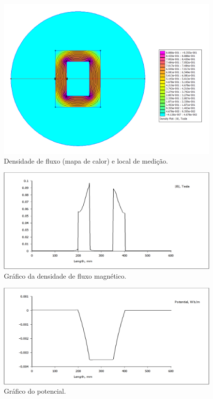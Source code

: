 \begin{figure}[H]
\centering
\includegraphics[scale=0.65]{img/assig1/femm2_4.png}
\caption[Densidade de fluxo (mapa de calor) e local de medição]{Densidade de fluxo (mapa de calor) e local de medição.}
\label{loc2_med}
\end{figure}

\begin{figure}[H]
\centering
\includegraphics[scale=0.3]{img/assig1/linha_B.png}
\caption[Gráfico da densidade de fluxo magnético]{Gráfico da densidade de fluxo magnético.}
\label{graf2_dfm}
\end{figure}

\begin{figure}[H]
\centering
\includegraphics[scale=0.3]{img/assig1/linha_pot.png}
\caption[Gráfico do potencial]{Gráfico do potencial.}
\label{graf2_pot}
\end{figure}

